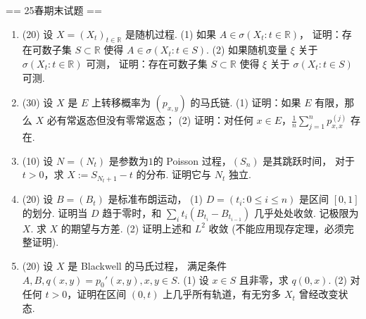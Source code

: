 == 25春期末试题 ==
\begin{enumerate}
    \item (20) 设 $X = (X_t)_{t \in \mathbb{R}}$ 是随机过程. 
    (1) 如果 $A \in \sigma(X_t: t \in \mathbb{R})$，
    证明：存在可数子集 $S \subset \mathbb{R}$ 使得 $A \in \sigma(X_t: t \in S)$. 
    (2) 如果随机变量 $\xi$ 关于 $\sigma(X_t: t \in \mathbb{R})$ 可测，
    证明：存在可数子集 $S \subset \mathbb{R}$ 使得 $\xi$ 关于 $\sigma(X_t: t \in S)$ 可测.
    \item (30) 设 $X$ 是 $E$ 上转移概率为 $(p_{x,y})$ 的马氏链. 
    (1) 证明：如果 $E$ 有限，那么 $X$ 必有常返态但没有零常返态；
    (2) 证明：对任何 $x \in E$，$\frac{1}{n} \sum_{j=1}^n p_{x,x}^{(j)}$ 存在.
    \item (10) 设 $N = (N_t)$ 是参数为$1$的 Poisson 过程，$(S_n)$ 是其跳跃时间，
    对于 $t > 0$，求 $X := S_{N_t + 1} - t$ 的分布. 证明它与 $N_t$ 独立.
    \item (20) 设 $B = (B_t)$ 是标准布朗运动，
    (1) $D = (t_i: 0 \leqslant i \leqslant n)$ 是区间 $[0,1]$ 的划分. 
    证明当 $D$ 趋于零时，和 $\sum_i t_i (B_{t_i} - B_{t_{i-1}})$ 几乎处处收敛. 
    记极限为 $X$. 求 $X$ 的期望与方差. 
    (2) 证明上述和 $L^2$ 收敛 (不能应用现存定理，必须完整证明).
    \item (20) 设 $X$ 是 Blackwell 的马氏过程，
    满足条件$A,B,q(x,y) = p_0'(x,y),x,y \in S$. 
    (1) 设 $x \in S$ 且非零，求 $q(0,x)$. 
    (2) 对任何 $t > 0$，证明在区间 $(0,t)$ 上几乎所有轨道，有无穷多 $X_t$ 曾经改变状态.
\end{enumerate}


